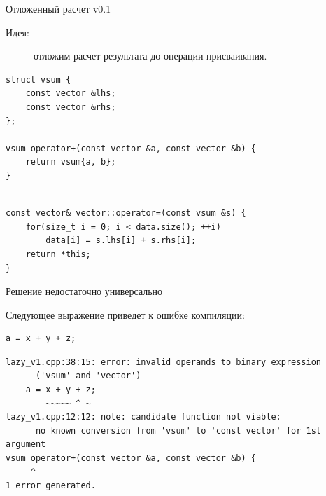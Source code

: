 \documentclass[@BEAMER_OPTIONS@]{beamer}
\begin{document}

\begin{frame}[fragile]{Отложенный расчет v0.1}
    \begin{description}
        \item[Идея:] отложим расчет результата до операции присваивания.
    \end{description}
    \pause
    \begin{exampleblock}{}
        \begin{lstlisting}
struct vsum {
    const vector &lhs;
    const vector &rhs;
};

vsum operator+(const vector &a, const vector &b) {
    return vsum{a, b};
}
        \end{lstlisting}
        \pause
        \begin{lstlisting}[firstnumber=last]

const vector& vector::operator=(const vsum &s) {
    for(size_t i = 0; i < data.size(); ++i)
        data[i] = s.lhs[i] + s.rhs[i];
    return *this;
}
        \end{lstlisting}
    \end{exampleblock}
\end{frame}

\note{ }

\begin{frame}[fragile]{Решение недостаточно универсально}
    \begin{exampleblock}{Следующее выражение приведет к ошибке компиляции:}
        \begin{lstlisting}
a = x + y + z;
        \end{lstlisting}
    \end{exampleblock}

    \begin{exampleblock}{}
        \begin{verbatim}
lazy_v1.cpp:38:15: error: invalid operands to binary expression
      ('vsum' and 'vector')
    a = x + y + z;
        ~~~~~ ^ ~
lazy_v1.cpp:12:12: note: candidate function not viable:
      no known conversion from 'vsum' to 'const vector' for 1st argument
vsum operator+(const vector &a, const vector &b) {
     ^
1 error generated.
        \end{verbatim}
    \end{exampleblock}
\end{frame}
\end{document}
